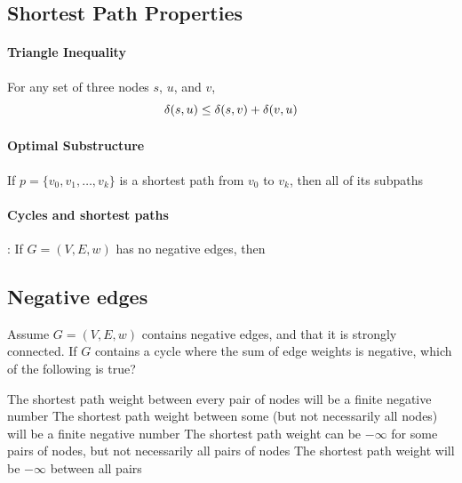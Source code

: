 \documentclass[11  pt]{exam}
\begin{document}
	
	\subsection{Shortest Path Properties}
	
	\paragraph{Triangle Inequality}
	For any set of three nodes $s$, $u$, and $v$,
	\begin{equation*}
		\delta(s,u) \leq \delta(s,v) + \delta(v,u) \\
	\end{equation*}
	
	\paragraph{Optimal Substructure}
	\begin{lemma} If $p = \{v_0, v_1, \hdots , v_k\}$ is a shortest path from $v_0$ to $v_k$, then all of its subpaths 
	\end{lemma}
	
	\vs{5cm}
	
	\paragraph{Cycles and shortest paths}
	\begin{lemma}: If $G = (V,E,w)$ has no negative edges, then %
	\end{lemma}
	\vs{2cm}
	
	
	\newpage
	
	\subsection{Negative edges}
	\begin{Qu}
		Assume $G = (V,E, w)$ contains negative edges, and that it is strongly connected. If $G$ contains a cycle where the sum of edge weights is negative, which of the following is true?
		\begin{itemize}
			\aitem The shortest path weight between every pair of nodes will be a finite negative number
			\bitem The shortest path weight between some (but not necessarily all nodes) will be a finite negative number
			\citem The shortest path weight can be $-\infty$ for some pairs of nodes, but not necessarily all pairs of nodes
			\ditem The shortest path weight will be $-\infty$ between all pairs
		\end{itemize}
	\end{Qu}
	\vs{5cm}
	
\end{document}

